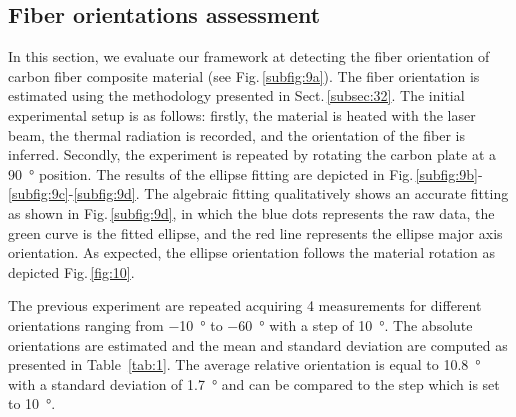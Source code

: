 \documentclass[12pt]{spieman}
\begin{document}
\begin{spacing}{2}

\subsection{Fiber orientations assessment}

In this section, we evaluate our framework at detecting the fiber orientation of carbon fiber composite material (see Fig.\,\ref{subfig:9a}).
The fiber orientation is estimated using the methodology presented in Sect.\,\ref{subsec:32}.
The initial experimental setup is as follows: 
firstly, the material is heated with the laser beam, the thermal radiation is recorded, and the orientation of the fiber is inferred. 
Secondly, the experiment is repeated by rotating the carbon plate at a \SI{90}{\degree} position.
The results of the ellipse fitting are depicted in Fig.\,\ref{subfig:9b}-\ref{subfig:9c}-\ref{subfig:9d}.
The algebraic fitting qualitatively shows an accurate fitting as shown in Fig.\,\ref{subfig:9d}, in which the blue dots represents the raw data, the green curve is the fitted ellipse, and the red line represents the ellipse major axis orientation.
As expected, the ellipse orientation follows the material rotation as depicted Fig.\,\ref{fig:10}.




	




The previous experiment are repeated acquiring 4 measurements for different orientations ranging from \SI{-10}{\degree} to \SI{-60}{\degree} with a step of \SI{10}{\degree}.
The absolute orientations are estimated and the mean and standard deviation are computed as presented in Table~\ref{tab:1}.
The average relative orientation is equal to \SI{10.8}{\degree} with a standard deviation of \SI{1.7}{\degree} and can be compared to the step which is set to \SI{10}{\degree}.


\end{spacing}
\end{document}

